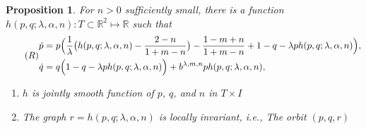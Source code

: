 \documentclass[a4paper,11pt]{article}
\newtheorem{proposition}{Proposition}[section]
\begin{document}
\begin{proposition}
For $n>0$ sufficiently small, there is a function $h(p,q;\lambda,\alpha,n) : T\subset \mathbb{R}^2 \mapsto \mathbb{R}$ such that
\begin{equation} \tag*{(${R}$)} \label{eq:reduced}
\begin{aligned}
 \dot{p} &=p\Big(\frac{1}{ \lambda }\big(h(p,q;\lambda,\alpha,n) - \frac{2-n}{1+m-n}\big) - \frac{1-m+n}{1+m-n} + 1-q- \lambda p h(p,q;\lambda,\alpha,n)\Big),\\
 \dot{q} &=q\Big(                                                                          1-q- \lambda p h(p,q;\lambda,\alpha,n)\Big) + b^{\lambda,m,n}ph(p,q;\lambda,\alpha,n),
\end{aligned}
\end{equation}


\begin{enumerate}
 \item $h$ is jointly smooth function of $p$, $q$, and $n$ in $T \times I$
 \item The graph $r=h(p,q;\lambda,\alpha,n)$ is locally invariant, i.e., The orbit $(p,q,r)$
\end{enumerate}

\end{proposition}
\end{document}
